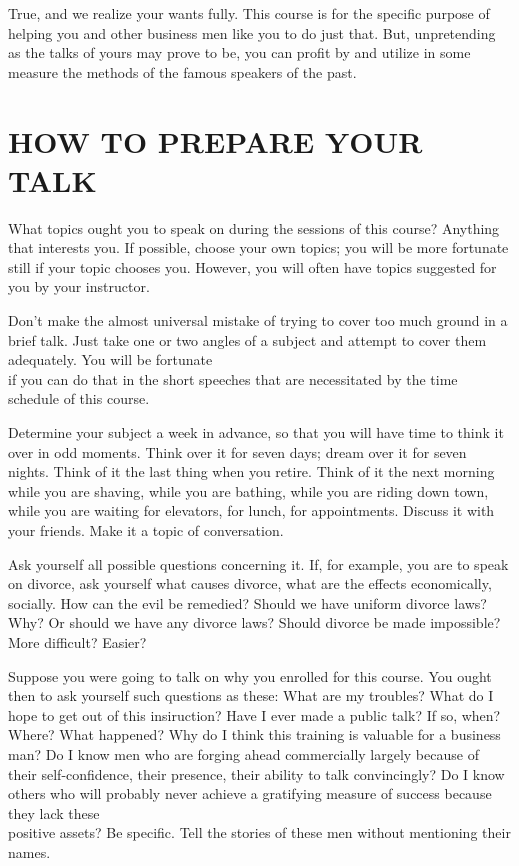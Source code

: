 \documentclass[10pt]{article}
\begin{document}
True, and we realize your wants fully. This course is for the specific purpose of helping you and other business men like you to do just that. But, unpretending as the talks of yours may prove to be, you can profit by and utilize in some measure the methods of the famous speakers of the past.

\section*{HOW TO PREPARE YOUR TALK}
What topics ought you to speak on during the sessions of this course? Anything that interests you. If possible, choose your own topics; you will be more fortunate still if your topic chooses you. However, you will often have topics suggested for you by your instructor.

Don't make the almost universal mistake of trying to cover too much ground in a brief talk. Just take one or two angles of a subject and attempt to cover them adequately. You will be fortunate\\
if you can do that in the short speeches that are necessitated by the time schedule of this course.

Determine your subject a week in advance, so that you will have time to think it over in odd moments. Think over it for seven days; dream over it for seven nights. Think of it the last thing when you retire. Think of it the next morning while you are shaving, while you are bathing, while you are riding down town, while you are waiting for elevators, for lunch, for appointments. Discuss it with your friends. Make it a topic of conversation.

Ask yourself all possible questions concerning it. If, for example, you are to speak on divorce, ask yourself what causes divorce, what are the effects economically, socially. How can the evil be remedied? Should we have uniform divorce laws? Why? Or should we have any divorce laws? Should divorce be made impossible? More difficult? Easier?

Suppose you were going to talk on why you enrolled for this course. You ought then to ask yourself such questions as these: What are my troubles? What do I hope to get out of this insiruction? Have I ever made a public talk? If so, when? Where? What happened? Why do I think this training is valuable for a business man? Do I know men who are forging ahead commercially largely because of their self-confidence, their presence, their ability to talk convincingly? Do I know others who will probably never achieve a gratifying measure of success because they lack these\\
positive assets? Be specific. Tell the stories of these men without mentioning their names.
\end{document}
